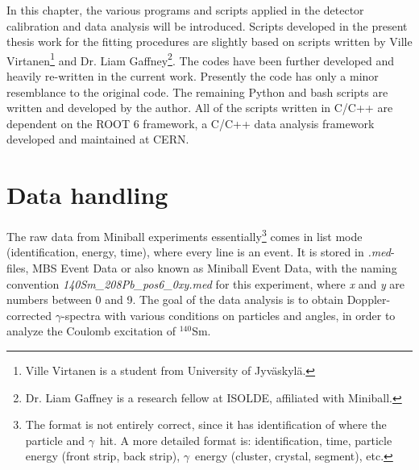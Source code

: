 \documentclass[twoside,english]{uiofysmaster/uiofysmaster}
\newcommand{\Sm}{$^{140}$Sm} %
\newcommand{\ga}{$\gamma$}
\begin{document}
In this chapter, the various programs and scripts applied in the detector calibration and data analysis will be introduced. 
Scripts developed in the present thesis work for the fitting procedures are slightly based on scripts written by Ville Virtanen\footnote{Ville Virtanen is a student from University of Jyväskylä.} and Dr. Liam Gaffney\footnote{Dr. Liam Gaffney is a research fellow at ISOLDE, affiliated with Miniball.}. 
The codes have been further developed and heavily re-written in the current work. 
Presently the code has only a minor resemblance to the original code. 
The remaining Python and bash scripts are written and developed by the author.
All of the scripts written in C/C++ are dependent on the ROOT 6 framework, a C/C++ data analysis framework developed and maintained at CERN.


\section{Data handling}
The raw data from Miniball experiments essentially\footnote{The format is not entirely correct, since it has identification of where the particle and \ga\ hit. 
A more detailed format is: identification, time, particle energy (front strip, back strip), \ga\ energy (cluster, crystal, segment), etc.} comes in list mode (identification, energy, time), where every line is an event. 
It is stored in \textit{.med}-files, MBS Event Data or also known as Miniball Event Data, with the naming convention \textit{140Sm\_208Pb\_pos6\_0xy.med} for this experiment, where \textit{x} and \textit{y} are numbers between 0 and 9. 
The goal of the data analysis is to obtain Doppler-corrected \ga-spectra with various conditions on particles and angles, in order to analyze the Coulomb excitation of \Sm. 

\end{document}
